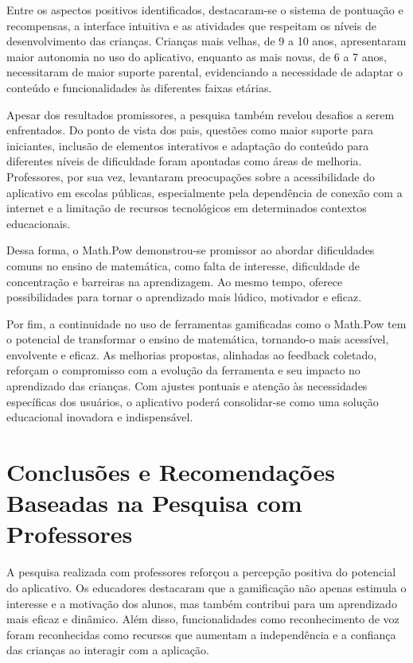 Entre os aspectos positivos identificados, destacaram-se o sistema de pontuação e recompensas, a interface intuitiva e as atividades que respeitam os níveis de desenvolvimento das crianças. Crianças mais velhas, de 9 a 10 anos, apresentaram maior autonomia no uso do aplicativo, enquanto as mais novas, de 6 a 7 anos, necessitaram de maior suporte parental, evidenciando a necessidade de adaptar o conteúdo e funcionalidades às diferentes faixas etárias.

Apesar dos resultados promissores, a pesquisa também revelou desafios a serem enfrentados. Do ponto de vista dos pais, questões como maior suporte para iniciantes, inclusão de elementos interativos e adaptação do conteúdo para diferentes níveis de dificuldade foram apontadas como áreas de melhoria. Professores, por sua vez, levantaram preocupações sobre a acessibilidade do aplicativo em escolas públicas, especialmente pela dependência de conexão com a internet e a limitação de recursos tecnológicos em determinados contextos educacionais.

Dessa forma, o Math.Pow demonstrou-se promissor ao abordar dificuldades comuns no ensino de matemática, como falta de interesse, dificuldade de concentração e barreiras na aprendizagem. Ao mesmo tempo, oferece possibilidades para tornar o aprendizado mais lúdico, motivador e eficaz.

Por fim, a continuidade no uso de ferramentas gamificadas como o Math.Pow tem o potencial de transformar o ensino de matemática, tornando-o mais acessível, envolvente e eficaz. As melhorias propostas, alinhadas ao feedback coletado, reforçam o compromisso com a evolução da ferramenta e seu impacto no aprendizado das crianças. Com ajustes pontuais e atenção às necessidades específicas dos usuários, o aplicativo poderá consolidar-se como uma solução educacional inovadora e indispensável.

\section{Conclusões e Recomendações Baseadas na Pesquisa com Professores}

A pesquisa realizada com professores reforçou a percepção positiva do potencial do aplicativo. Os educadores destacaram que a gamificação não apenas estimula o interesse e a motivação dos alunos, mas também contribui para um aprendizado mais eficaz e dinâmico. Além disso, funcionalidades como reconhecimento de voz foram reconhecidas como recursos que aumentam a independência e a confiança das crianças ao interagir com a aplicação.

